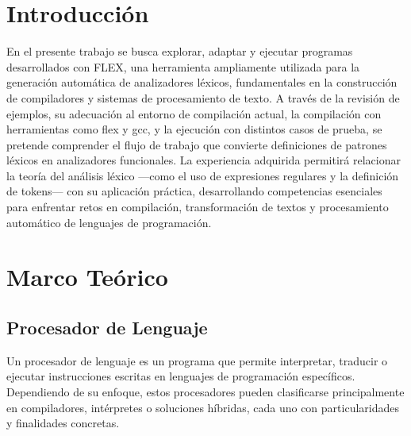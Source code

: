 \documentclass{article}
\begin{document}


\section{Introducción}\label{sec:intr}

En el presente trabajo se busca explorar, adaptar y ejecutar programas desarrollados con FLEX, una herramienta ampliamente utilizada para la generación automática de analizadores léxicos, fundamentales en la construcción de compiladores y sistemas de procesamiento de texto. A través de la revisión de ejemplos, su adecuación al entorno de compilación actual, la compilación con herramientas como flex y gcc, y la ejecución con distintos casos de prueba, se pretende comprender el flujo de trabajo que convierte definiciones de patrones léxicos en analizadores funcionales. La experiencia adquirida permitirá relacionar la teoría del análisis léxico —como el uso de expresiones regulares y la definición de tokens— con su aplicación práctica, desarrollando competencias esenciales para enfrentar retos en compilación, transformación de textos y procesamiento automático de lenguajes de programación.

\section{Marco Teórico}\label{sec:marc}

\subsection*{Procesador de Lenguaje}

Un procesador de lenguaje es un programa que permite interpretar, traducir o ejecutar instrucciones escritas en lenguajes de programación específicos. Dependiendo de su enfoque, estos procesadores pueden clasificarse principalmente en compiladores, intérpretes o soluciones híbridas, cada uno con particularidades y finalidades concretas.
\end{document}
